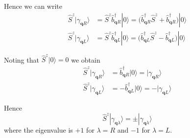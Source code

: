 Hence we can write
\begin{align*}
\hat S^z|\gamma_{\mathbf qR}\rangle&=\hat S^z\hat b_{\mathbf qR}^\dag|0\rangle
=\big(\hat b_{\mathbf qR}^\dag\hat S^z+\hat b_{\mathbf qR}^\dag\big)|0\rangle
\\
\hat S^z|\gamma_{\mathbf qL}\rangle&=\hat S^z\hat b_{\mathbf qL}^\dag|0\rangle
=\big(\hat b_{\mathbf qL}^\dag\hat S^z-\hat b_{\mathbf qL}^\dag\big)|0\rangle
\end{align*}

Noting that $\hat S^z|0\rangle=0$ we obtain
\begin{align*}
\hat S^z|\gamma_{\mathbf qR}\rangle&=\hat b_{\mathbf qR}^\dag|0\rangle
=|\gamma_{\mathbf qR}\rangle
\\
\hat S^z|\gamma_{\mathbf qL}\rangle&=-\hat b_{\mathbf qL}^\dag|0\rangle
=-|\gamma_{\mathbf qL}\rangle
\end{align*}

Hence
\begin{equation*}
\hat S^z|\gamma_{\mathbf q\lambda}\rangle=\pm|\gamma_{\mathbf q\lambda}\rangle
\end{equation*}
where the eigenvalue is $+1$ for $\lambda=R$ and $-1$ for $\lambda=L$.


